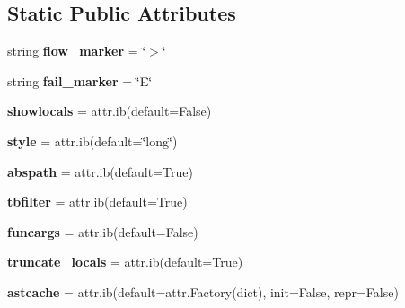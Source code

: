 \subsection*{Static Public Attributes}
\begin{DoxyCompactItemize}
\item 
\mbox{\label{class__pytest_1_1__code_1_1code_1_1_formatted_excinfo_ac291681187b99a3a11783a2b131c6b9b}} 
string {\bfseries flow\+\_\+marker} = \char`\"{}$>$\char`\"{}
\item 
\mbox{\label{class__pytest_1_1__code_1_1code_1_1_formatted_excinfo_a15e2e0970d57384b65e91aee0f806473}} 
string {\bfseries fail\+\_\+marker} = \char`\"{}E\char`\"{}
\item 
\mbox{\label{class__pytest_1_1__code_1_1code_1_1_formatted_excinfo_ac34b5c2e7d3f484528216da148d44d89}} 
{\bfseries showlocals} = attr.\+ib(default=False)
\item 
\mbox{\label{class__pytest_1_1__code_1_1code_1_1_formatted_excinfo_ae44a7a9f6577ea3f01cb5c6079cfcfce}} 
{\bfseries style} = attr.\+ib(default=\char`\"{}long\char`\"{})
\item 
\mbox{\label{class__pytest_1_1__code_1_1code_1_1_formatted_excinfo_a9496ee0c41b8ab39f17c8517828bd9f5}} 
{\bfseries abspath} = attr.\+ib(default=True)
\item 
\mbox{\label{class__pytest_1_1__code_1_1code_1_1_formatted_excinfo_accba3d951a73be3489622e6947e7acf4}} 
{\bfseries tbfilter} = attr.\+ib(default=True)
\item 
\mbox{\label{class__pytest_1_1__code_1_1code_1_1_formatted_excinfo_a8d7bf80da51c024c3a91bddf9b3ec1a6}} 
{\bfseries funcargs} = attr.\+ib(default=False)
\item 
\mbox{\label{class__pytest_1_1__code_1_1code_1_1_formatted_excinfo_a7186b37dabe1819c3c76c071c9712000}} 
{\bfseries truncate\+\_\+locals} = attr.\+ib(default=True)
\item 
\mbox{\label{class__pytest_1_1__code_1_1code_1_1_formatted_excinfo_a94725f5c0ed554b0d11fde3406398719}} 
{\bfseries astcache} = attr.\+ib(default=attr.\+Factory(dict), init=False, repr=False)
\end{DoxyCompactItemize}


